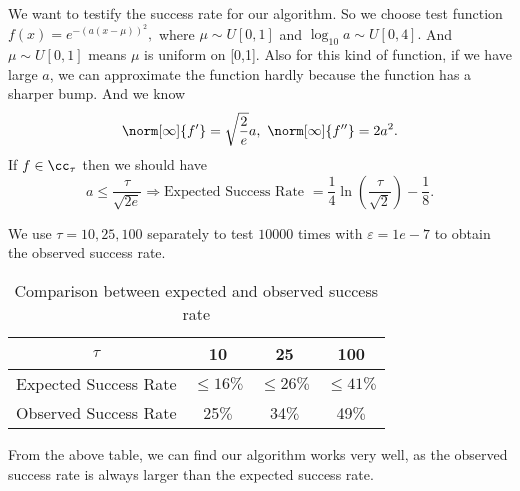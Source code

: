 We want to testify the success rate for our algorithm. So we
choose test function $f(x)=e^{-(a(x-\mu))^2},$
where $\mu \sim U[0,1]$ and $\log_{10} a \sim U[0,4].$
And $\mu \sim U[0,1]$ means $\mu$ is uniform on [0,1].
Also for this kind of function, if we have large $a$, we can approximate the function hardly
because the function has a sharper bump. And we know
$$\norm[\infty]{f'}=\sqrt{\frac{2}{e}} a, \ \norm[\infty]{f''}=2a^2.$$
If $f \in \cc_{\tau}$ then we should have
$$a \leq \frac{\tau}{\sqrt{2e}} \Rightarrow \text{Expected Success Rate }= \frac{1}{4}\ln\left(\frac{\tau}{\sqrt{2}}\right) -\frac{1}{8}.$$

We use $\tau = 10, 25 , 100$ separately to test $10000$ times with
$\varepsilon = 1e-7$ to obtain the observed success rate.
\begin{table}[h]
\centering
\begin{tabular}{cccc}
$\tau$ &  10 & 25 & 100\\
\toprule 
Expected Success Rate &  $\leq 16 \%$ &  $\leq 26 \%$  & $\leq 41 \%$ \\
Observed Success Rate & 25$\%$ &  34$\%$  & 49$\%$ \\
\end{tabular}
\caption{ Comparison between expected and observed success rate}
\end{table}

From the above table, we can find our algorithm works very well, as the observed
success rate is always larger than the expected success rate.\\




